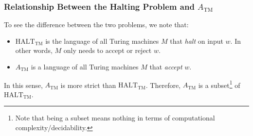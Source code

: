 \documentclass[letterpaper]{article}
\begin{document}
\subsubsection{Relationship Between the Halting Problem and \texorpdfstring{$A_{\text{TM}}$}{ATM}}
To see the difference between the two problems, we note that: 
\begin{itemize}
    \item $\text{HALT}_{\text{TM}}$ is the language of all Turing machines $M$ that \emph{halt} on input $w$. In other words, $M$ only needs to accept or reject $w$.
    \item $A_{\text{TM}}$ is a language of all Turing machines $M$ that \emph{accept} $w$. 
\end{itemize}
In this sense, $A_{\text{TM}}$ is more strict than $\text{HALT}_{\text{TM}}$. Therefore, $A_{\text{TM}}$ is a subset\footnote{Note that being a subset means nothing in terms of computational complexity/decidability.} of $\text{HALT}_{\text{TM}}$.
\end{document}
